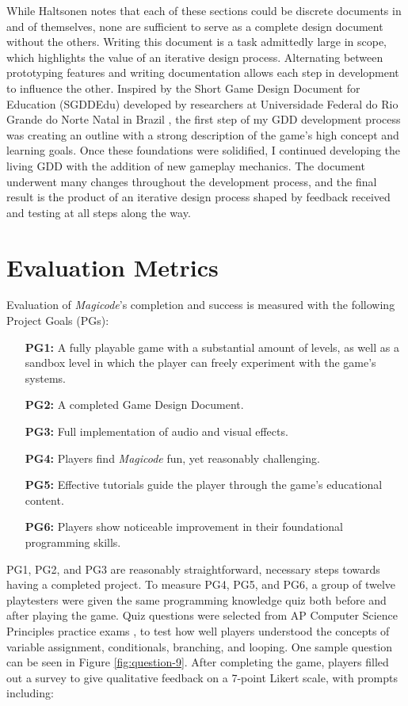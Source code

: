 \documentclass[10pt,twocolumn]{article}
\begin{document}
While Haltsonen notes that each of these sections could be discrete documents in and of themselves, none are sufficient to serve as a complete design document without the others. Writing this document is a task admittedly large in scope, which highlights the value of an iterative design process. Alternating between prototyping features and writing documentation allows each step in development to influence the other. Inspired by the Short Game Design Document for Education (SGDDEdu) developed by researchers at Universidade Federal do Rio Grande do Norte Natal in Brazil \cite{gdd-ed-game}, the first step of my GDD development process was creating an outline with a strong description of the game’s high concept and learning goals. Once these foundations were solidified, I continued developing the living GDD with the addition of new gameplay mechanics. The document underwent many changes throughout the development process, and the final result is the product of an iterative design process shaped by feedback received and testing at all steps along the way.



\section{Evaluation Metrics}

Evaluation of \textit{Magicode}’s completion and success is measured with the following Project Goals (PGs):

\begin{itemize}[leftmargin=.5in]
    \item[\textbf{PG1:}] A fully playable game with a substantial amount of levels, as well as a sandbox level in which the player can freely experiment with the game’s systems.
    \item[\textbf{PG2:}] A completed Game Design Document.
    \item[\textbf{PG3:}] Full implementation of audio and visual effects.
    \item[\textbf{PG4:}] Players find \textit{Magicode} fun, yet reasonably challenging.
    \item[\textbf{PG5:}] Effective tutorials guide the player through the game’s educational content.
    \item[\textbf{PG6:}] Players show noticeable improvement in their foundational programming skills.
\end{itemize}

PG1, PG2, and PG3 are reasonably straightforward, necessary steps towards having a completed project. To measure PG4, PG5, and PG6, a group of twelve playtesters were given the same programming knowledge quiz both before and after playing the game. Quiz questions were selected from AP Computer Science Principles practice exams \cite{ap-practice-exam}, \cite{ap-practice-website} to test how well players understood the concepts of variable assignment, conditionals, branching, and looping. One sample question can be seen in Figure \ref{fig:question-9}. After completing the game, players filled out a survey to give qualitative feedback on a 7-point Likert scale, with prompts including:
\end{document}
